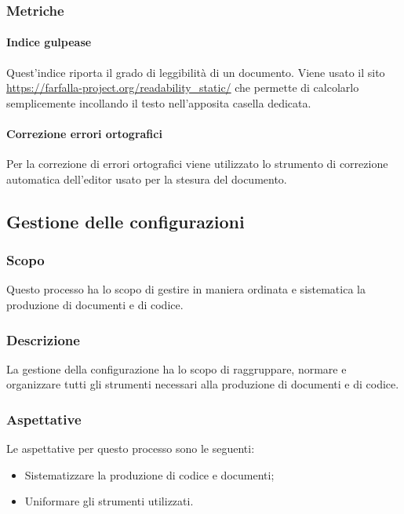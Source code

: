 \documentclass[../norme_di_progetto.tex]{subfiles}
\begin{document}
\subsubsection{Metriche}

\paragraph{Indice gulpease}
Quest'indice riporta il grado di leggibilità di un documento. Viene usato il sito \url{https://farfalla-project.org/readability_static/} che permette di calcolarlo semplicemente incollando il testo nell'apposita casella dedicata.

\paragraph{Correzione errori ortografici}
Per la correzione di errori ortografici viene utilizzato lo strumento di correzione automatica dell'editor usato per la stesura del documento.

\subsection{Gestione delle configurazioni}

\subsubsection{Scopo}
Questo processo ha lo scopo di gestire in maniera ordinata e sistematica la produzione di documenti e di codice.

\subsubsection{Descrizione}
La gestione della configurazione ha lo scopo di raggruppare, normare e organizzare tutti gli strumenti necessari alla produzione di documenti e di codice.

\subsubsection{Aspettative}
Le aspettative per questo processo sono le seguenti:
\begin{itemize}
    \item Sistematizzare la produzione di codice e documenti;
    \item Uniformare gli strumenti utilizzati.
\end{itemize}
\end{document}
